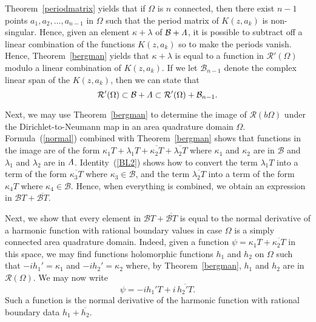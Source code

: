 \documentclass[12pt]{amsart}
\newcommand\Om{\Omega}
\numberwithin{equation}{section}
\begin{document}
Theorem~\ref{periodmatrix} yields that if $\Om$
is $n$ connected, then there exist $n-1$ points
$a_1,a_2,\dots,a_{n-1}$ in $\Om$ such that the period
matrix of $K(z,a_k)$ is non-singular. Hence, given an
element $\kappa+\lambda$ of
$\mathcal{B}+\mathnormal{\Lambda}$,
it is possible to subtract off a linear combination of
the functions $K(z,a_k)$ so to make the periods vanish.
Hence, Theorem~\ref{bergman} yields that
$\kappa+\lambda$ is equal to a function in $\mathcal{R}'(\Om)$
modulo a linear combination of $K(z,a_k)$. If we let
$\mathcal{B}_{n-1}$ denote the complex linear span of
the $K(z,a_k)$, then we can state that
$$\mathcal{R}'(\Om)\subset \mathcal{B}+\mathnormal{\Lambda}\subset
\mathcal{R}'(\Om)+\mathcal{B}_{n-1}.$$

Next, we may use Theorem~\ref{bergman} to determine
the image of $\mathcal{R}(b\Om)$ under the Dirichlet-to-Neumann
map in an area quadrature domain $\Om$. Formula~(\ref{normal})
combined with Theorem~\ref{bergman} shows that functions in
the image are of the form
$\kappa_1 T + \lambda_1 T +\overline{\kappa_2 T}
+\overline{\lambda_2 T}$
where $\kappa_1$ and $\kappa_2$ are in $\mathcal B$ and
$\lambda_1$ and $\lambda_2$ are in $\mathnormal{\Lambda}$.
Identity~(\ref{BL2})
shows how to convert the term $\lambda_1 T$ into a term
of the form $\overline{\kappa_3 T}$ where $\kappa_3\in\mathcal B$,
and the term $\overline{\lambda_2T}$ into a term of the
form $\kappa_4 T$ where $\kappa_4\in\mathcal B$.
Hence, when everything is combined, we obtain an expression in
$\mathcal B T+ \overline{\mathcal B T}$.

Next, we show that every element in
$\mathcal B T+ \overline{\mathcal B T}$ is equal to the
normal derivative of a harmonic function with rational
boundary values in case $\Om$ is a simply connected area
quadrature domain. Indeed, given a function
$\psi=\kappa_1 T + \overline{\kappa_2 T}$ in this space,
we may find functions holomorphic functions $h_1$ and $h_2$
on $\Om$ such that $-ih_1'=\kappa_1$ and $-ih_2'=\kappa_2$
where, by Theorem~\ref{bergman}, $h_1$ and $h_2$ are in
$\mathcal{R}(\Om)$. We may now write
$$\psi=-ih_1'T + i\,\overline{h_2'T}.$$
Such a function is the normal derivative of the harmonic
function with rational boundary data $h_1+\overline{h_2}$.
\end{document}
